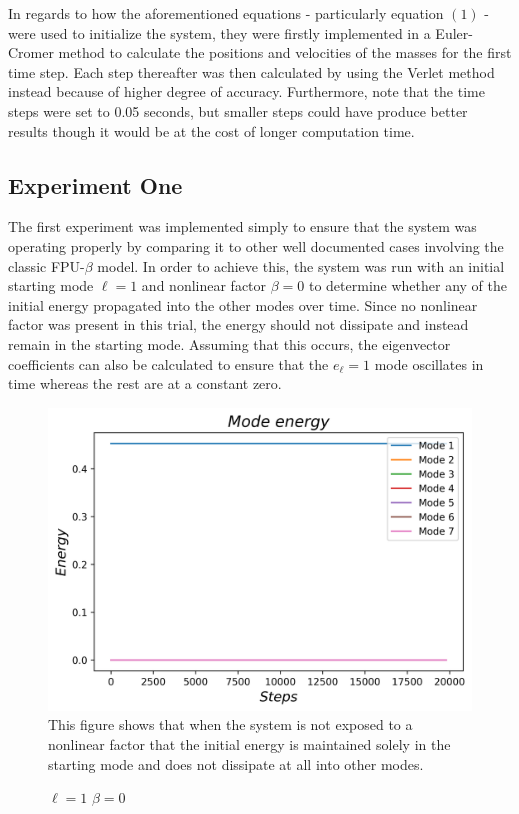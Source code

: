 \documentclass[twocolumn]{article}
\begin{document}
In regards to how the aforementioned equations - particularly equation $(1)$ - were used to initialize the system, they were firstly implemented in a Euler-Cromer method  to calculate the positions and velocities of the masses for the first time step. Each step thereafter was then calculated by using the Verlet method instead because of higher degree of accuracy. Furthermore, note that the time steps were set to 0.05 seconds, but smaller steps could have produce better results though it would be at the cost of longer computation time. 
\subsection{Experiment One}
The first experiment was implemented simply to ensure that the system was operating properly by comparing it to other well documented cases involving the classic FPU-$\beta$ model. In order to achieve this, the system was run with an initial starting mode $\ell=1$ and nonlinear factor $\beta=0$ to determine whether any of the initial energy propagated into the other modes over time. Since no nonlinear factor was present in this trial, the energy should not dissipate and instead remain in the starting mode. Assuming that this occurs, the eigenvector coefficients can also be calculated to ensure that the $e_\ell=1$ mode oscillates in time whereas the rest are at a constant zero.
\begin{center}
\begin{figure}[ht!]
\centering
\caption{$\ell=1$ $\beta=0$}
\includegraphics[scale=.55]{EnergiesN=1B=0}
\small{This figure shows that when the system is not exposed to a nonlinear factor that the initial energy is maintained solely in the starting mode and does not dissipate at all into other modes.}
\end{figure}
\end{center}
\end{document}
